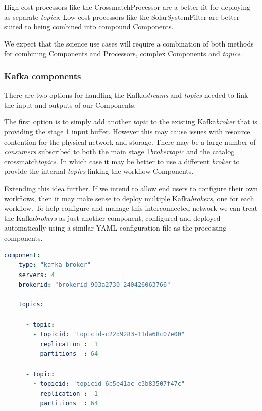\documentclass{article}
\newcommand{\yaml} {YAML\xspace}
\newcommand{\kafka} {Kafka\xspace}
\newcommand{\kftopic} {\textit{topic}\xspace}
\newcommand{\kftopics} {\textit{topics}\xspace}
\newcommand{\kfstreams} {\textit{streams}\xspace}
\newcommand{\kfbroker} {\textit{broker}\xspace}
\newcommand{\kfbrokers} {\textit{brokers}\xspace}
\newcommand{\kfconsumers} {\textit{consumers}\xspace}
\newcommand{\crossmatch} {crossmatch\xspace}
\newcommand{\catalog} {catalog\xspace}
\newcommand{\stageone} {stage 1\xspace}
\newcommand{\javaname}[1] {{\ttfamily\color{codeblue} #1}}
\newcommand{\javaplural}[1] {\javaname{#1}s}
\begin{document}
High cost processors like the \javaname{CrossmatchProcessor} are a better fit for deploying as separate \kftopics. Low cost processors like the \javaname{SolarSystemFilter} are better suited to being combined into compound \javaname{Components}.

We expect that the science use cases will require a combination of both methods for combining \javaplural{Component} and \javaplural{Processor}, complex \javaplural{Component} and \kftopics.

\subsubsection{Kafka components}
\label{workflow.kafka-components}

There are two options for handling the \kafka \kfstreams and \kftopics needed to link the input and outputs of our \javaplural{Component}. 

The first option is to simply add another \kftopic to the existing \kafka \kfbroker that is providing the \stageone input buffer. However this may cause issues with resource contention for the physical network and storage.
There may be a large number of \kfconsumers subscribed to both the main \stageone \kfbroker \kftopic and the \catalog \crossmatch \kftopics.
In which case it may be better to use a different \kfbroker to provide the internal \kftopics linking the workflow \javaplural{Component}.

Extending this idea further.
If we intend to allow end users to configure their own workflows, then it may make sense to deploy multiple \kafka \kfbrokers, one for each workflow.
To help configure and manage this interconnected network we can treat the \kafka \kfbrokers as just another component, configured and deployed automatically using a similar \yaml configuration file as the processing components.

\begin{lstlisting}[language=yaml]
  component:
    type: "kafka-broker"
    servers: 4 
    brokerid: "brokerid-903a2730-240426063766"

    topics:

      - topic:
        - topicid: "topicid-c22d9283-11da68c07e00"
          replication :  1
          partitions  : 64

      - topic:
        - topicid: "topicid-6b5e41ac-c3b83507f47c"
          replication :  1
          partitions  : 64
\end{lstlisting}
\end{document}
